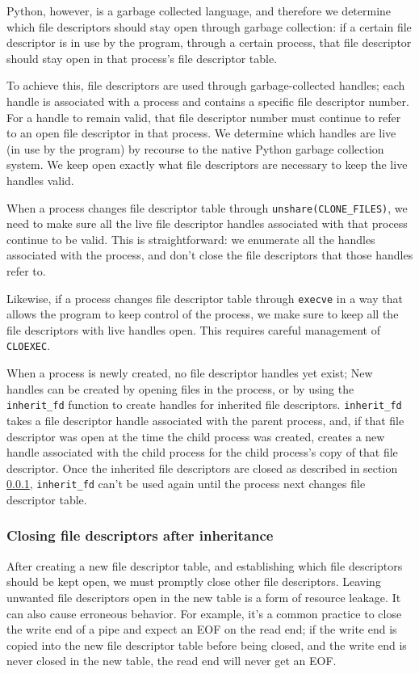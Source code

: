 \documentclass[sigplan]{acmart}
\begin{document}
Python, however, is a garbage collected language,
and therefore we determine which file descriptors should stay open through garbage collection:
if a certain file descriptor is in use by the program,
through a certain process,
that file descriptor should stay open in that process's file descriptor table.

To achieve this, file descriptors are used through garbage-collected handles;
each handle is associated with a process and contains a specific file descriptor number.
For a handle to remain valid,
that file descriptor number must continue to refer to an open file descriptor in that process.
We determine which handles are live (in use by the program)
by recourse to the native Python garbage collection system.
We keep open exactly what file descriptors are necessary to keep the live handles valid.

When a process changes file descriptor table through \verb|unshare(CLONE_FILES)|,
we need to make sure all the live file descriptor handles associated with that process continue to be valid.
This is straightforward:
we enumerate all the handles associated with the process,
and don't close the file descriptors that those handles refer to.

Likewise, if a process changes file descriptor table through \texttt{execve}
in a way that allows the program to keep control of the process,
we make sure to keep all the file descriptors with live handles open.
This requires careful management of \texttt{CLOEXEC}.

When a process is newly created,
no file descriptor handles yet exist;
New handles can be created by opening files in the process,
or by using the \verb|inherit_fd| function to create handles for inherited file descriptors.
\verb|inherit_fd| takes a file descriptor handle associated with the parent process,
and, if that file descriptor was open at the time the child process was created,
creates a new handle associated with the child process
for the child process's copy of that file descriptor.
Once the inherited file descriptors are closed as described in section \ref{cloexec},
\verb|inherit_fd| can't be used again until the process next changes file descriptor table.
\subsubsection{Closing file descriptors after inheritance}\label{cloexec}
After creating a new file descriptor table,
and establishing which file descriptors should be kept open,
we must promptly close other file descriptors.
Leaving unwanted file descriptors open in the new table is a form of resource leakage.
It can also cause erroneous behavior.
For example, it's a common practice to close the write end of a pipe
and expect an EOF on the read end;
if the write end is copied into the new file descriptor table before being closed,
and the write end is never closed in the new table,
the read end will never get an EOF.
\end{document}
